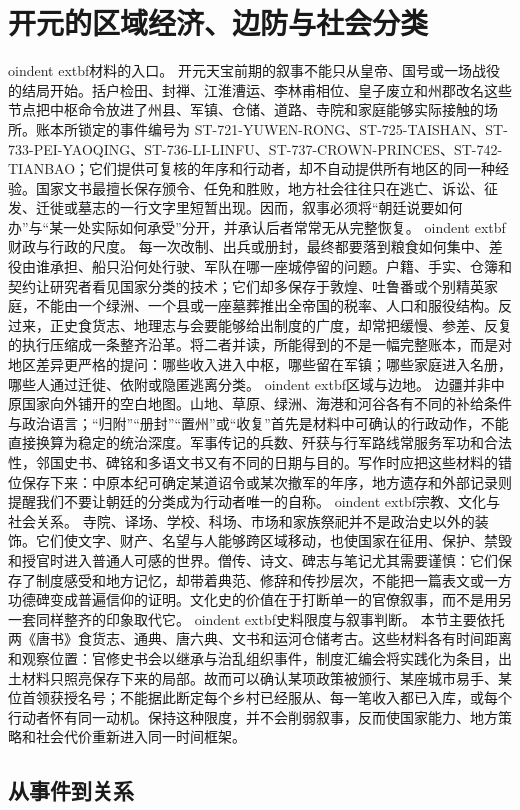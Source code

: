 \section{开元的区域经济、边防与社会分类} \label{sec:kaiyuan-regional-economy}  oindent	extbf{材料的入口。} 开元天宝前期的叙事不能只从皇帝、国号或一场战役的结局开始。括户检田、封禅、江淮漕运、李林甫相位、皇子废立和州郡改名这些节点把中枢命令放进了州县、军镇、仓储、道路、寺院和家庭能够实际接触的场所。账本所锁定的事件编号为 ST-721-YUWEN-RONG、ST-725-TAISHAN、ST-733-PEI-YAOQING、ST-736-LI-LINFU、ST-737-CROWN-PRINCES、ST-742-TIANBAO；它们提供可复核的年序和行动者，却不自动提供所有地区的同一种经验。国家文书最擅长保存颁令、任免和胜败，地方社会往往只在逃亡、诉讼、征发、迁徙或墓志的一行文字里短暂出现。因而，叙事必须将“朝廷说要如何办”与“某一处实际如何承受”分开，并承认后者常常无从完整恢复。   oindent	extbf{财政与行政的尺度。} 每一次改制、出兵或册封，最终都要落到粮食如何集中、差役由谁承担、船只沿何处行驶、军队在哪一座城停留的问题。户籍、手实、仓簿和契约让研究者看见国家分类的技术；它们却多保存于敦煌、吐鲁番或个别精英家庭，不能由一个绿洲、一个县或一座墓葬推出全帝国的税率、人口和服役结构。反过来，正史食货志、地理志与会要能够给出制度的广度，却常把缓慢、参差、反复的执行压缩成一条整齐沿革。将二者并读，所能得到的不是一幅完整账本，而是对地区差异更严格的提问：哪些收入进入中枢，哪些留在军镇；哪些家庭进入名册，哪些人通过迁徙、依附或隐匿逃离分类。   oindent	extbf{区域与边地。} 边疆并非中原国家向外铺开的空白地图。山地、草原、绿洲、海港和河谷各有不同的补给条件与政治语言；“归附”“册封”“置州”或“收复”首先是材料中可确认的行政动作，不能直接换算为稳定的统治深度。军事传记的兵数、歼获与行军路线常服务军功和合法性，邻国史书、碑铭和多语文书又有不同的日期与目的。写作时应把这些材料的错位保存下来：中原本纪可确定某道诏令或某次撤军的年序，地方遗存和外部记录则提醒我们不要让朝廷的分类成为行动者唯一的自称。   oindent	extbf{宗教、文化与社会关系。} 寺院、译场、学校、科场、市场和家族祭祀并不是政治史以外的装饰。它们使文字、财产、名望与人能够跨区域移动，也使国家在征用、保护、禁毁和授官时进入普通人可感的世界。僧传、诗文、碑志与笔记尤其需要谨慎：它们保存了制度感受和地方记忆，却带着典范、修辞和传抄层次，不能把一篇表文或一方功德碑变成普遍信仰的证明。文化史的价值在于打断单一的官僚叙事，而不是用另一套同样整齐的印象取代它。   oindent	extbf{史料限度与叙事判断。} 本节主要依托两《唐书》食货志、通典、唐六典、文书和运河仓储考古。这些材料各有时间距离和观察位置：官修史书会以继承与治乱组织事件，制度汇编会将实践化为条目，出土材料只照亮保存下来的局部。故而可以确认某项政策被颁行、某座城市易手、某位首领获授名号；不能据此断定每个乡村已经服从、每一笔收入都已入库，或每个行动者怀有同一动机。保持这种限度，并不会削弱叙事，反而使国家能力、地方策略和社会代价重新进入同一时间框架。  \subsection{从事件到关系} 